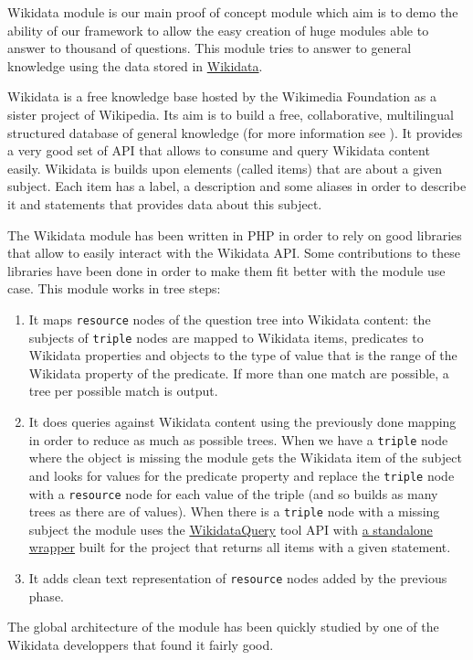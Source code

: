 Wikidata module is our main proof of concept module which aim is to demo the ability of our framework to allow the easy creation of huge modules able to answer to thousand of questions. This module tries to answer to general knowledge using the data stored in \href{http://www.wikidata.org}{Wikidata}.

Wikidata is a free knowledge base hosted by the Wikimedia Foundation as a sister project of Wikipedia. Its aim is to build a free, collaborative, multilingual structured database of general knowledge (for more information see \cite{42240}). It provides a very good set of API that allows to consume and query Wikidata content easily. Wikidata is builds upon elements (called items) that are about a given subject. Each item has a label, a description and some aliases in order to describe it and statements that provides data about this subject.

The Wikidata module has been written in PHP in order to rely on good libraries that allow to easily interact with the Wikidata API. Some contributions to these libraries have been done in order to make them fit better with the module use case. This module works in tree steps:
\begin{enumerate}
    \item It maps \texttt{resource} nodes of the question tree into Wikidata content: the subjects of \texttt{triple} nodes are mapped to Wikidata items, predicates to Wikidata properties and objects to the type of value that is the range of the Wikidata property of the predicate. If more than one match are possible, a tree per possible match is output.
    \item It does queries against Wikidata content using the previously done mapping in order to reduce as much as possible trees. When we have a \texttt{triple} node where the object is missing the module gets the Wikidata item of the subject and looks for values for the predicate property and replace the \texttt{triple} node with a \texttt{resource} node for each value of the triple (and so builds as many trees as there are of values). When there is a \texttt{triple} node with a missing subject the module uses the \href{http://wdq.wmflabs.org}{WikidataQuery} tool API with \href{https://github.com/ProjetPP/WikidataQueryApi}{a standalone wrapper} built for the project that returns all items with a given statement.
    \item It adds clean text representation of \texttt{resource} nodes added by the previous phase.
\end{enumerate}

The global architecture of the module has been quickly studied by one of the Wikidata developpers that found it fairly good.